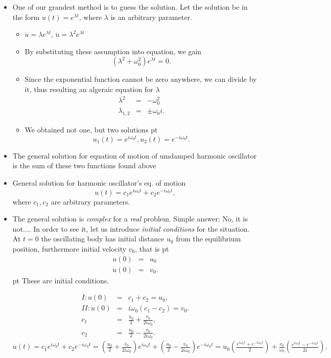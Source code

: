 \documentclass[t,aspectratio=169]{beamer}
\begin{document}
\begin{frame}
\begin{itemize}
\pagebreak
\item One of our grandest method is to guess the solution. Let the solution be in the form $u(t)=e^{\lambda t}$, where $\lambda$ is an arbitrary parameter.
\begin{itemize}
\item $\dot{u}=\lambda e^{\lambda t}$, $\ddot{u}=\lambda^{2}e^{\lambda t}$
\item By substituting these assumption into equation, we gain
  $$ \left(\lambda^{2}+\omega_{0}^{2}\right)e^{\lambda t}=0.$$
\item Since the exponential function cannot be zero anywhere, we can divide by it, thus resulting an algeraic equation for $\lambda$
\begin{eqnarray*}
\lambda^{2}&=&-\omega_{0}^{2} \\
\lambda_{1,2}&=&\pm\omega_{0}i.
\end{eqnarray*}
\item We obtained not one, but two solutions
 pt
$$ u_{1}(t)=e^{i\omega_{0}t}, u_{2}(t)=e^{-i\omega_{0}t}.$$
\end{itemize}

\pagebreak
\item The general solution for equation of motion of umdamped harmonic oscillator is the sum of these two functions found above
\item General solution for harmonic oscillator's eq. of motion
$$u\left(t\right)=c_{1}e^{i\omega_{0}t}+c_{2}e^{-i\omega_{0}t},$$
where $c_{1},c_{2}$ are arbitrary parameters.
\item The general solution is \emph{complex} for a \emph{real} problem. Simple answer: No, it is not$\dots$. In order to see it, let us introduce \emph{initial conditions} for the situation. At $t=0$ the oscillating body has initial distance $u_{0}$ from the equilibrium position, furthermore initial velocity $v_{0}$, that is
 pt
  \begin{eqnarray*}
    u\left(0\right)&=&u_{0}\\
    \dot{u}\left(0\right)&=&v_{0}.
  \end{eqnarray*}
   pt
These are initial conditions.

\pagebreak
\begin{eqnarray*}
I:u(0)&=&c_{1}+c_{2}=u_{0}, \\
II:\dot{u}(0)&=&i\omega_{0}\left(c_{1}-c_{2}\right)=v_{0}. \\
c_{1}&=&\frac{u_{0}}{2}+\frac{v_{0}}{2i\omega_{0}}, \\
c_{2}&=&\frac{u_{0}}{2}-\frac{v_{0}}{2i\omega_{0}}.
\end{eqnarray*}
$u(t)=c_{1}e^{i\omega_{0}t}+c_{2}e^{-i\omega_{0}t}=\left(\frac{u_{0}}{2}+\frac{v_{0}}{2i\omega_{0}}\right)e^{i\omega_{0}t}+\left(\frac{u_{0}}{2}-\frac{v_{0}}{2i\omega_{0}}\right)e^{-i\omega_{0}t}=u_{0}\left(\frac{e^{i\omega_{0}t}+e^{-i\omega_{0}t}}{2}\right)+\frac{v_{0}}{\omega_{0}}\left(\frac{e^{i\omega_{0}t}-e^{-i\omega_{0}t}}{2i}\right).$


\end{itemize}
\end{frame}
\end{document}
